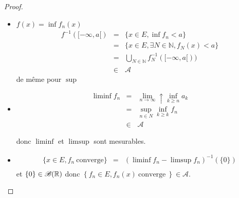\begin{proof}
	\begin{itemize}
		\item $f(x) = \inf f_n (x)$
		      \begin{eqnarray*}
			      f^{-1}([-\infty, a[) &=& \{x \in E, \inf f_n < a\} \\
			      &=& \{x \in E, \exists N \in \mathbb{N}, f_N (x) < a \}\\
			      &=& \bigcup\limits_{N\in \mathbb{N}}f_N^{-1}([-\infty, a[))\\
			      &\in& \mathscr{A}
		      \end{eqnarray*}
		      de même pour $\sup$
		\item \begin{eqnarray*}
			      \liminf f_n &=& \lim\limits_{n \to \infty}\uparrow \inf\limits_{k \geq n } a_k\\
			      &=& \sup _{n\in N} \inf_{k \geq k} f_n\\
			      &\in& \mathscr{A}
		      \end{eqnarray*}

		      donc $\liminf$ et $\limsup$ sont mesurables.
		\item
		      \begin{eqnarray*}
			      \{x \in E, f_n \  \text{converge} \}  &=& (\liminf f_n - \limsup f_n)^{-1}(\{0\})\\
		      \end{eqnarray*}
		      et $\{ 0 \} \in \mathscr{B}(\mathbb{R})$ donc $\left\{ f_n \in E, f_n(x) \ \text{converge} \ \right\} \in \mathscr{A}$.
	\end{itemize}

\end{proof}
